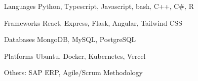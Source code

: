 

\begin{cvskills}

  \cvskill
  {Languages} %
  {} %
  {Python, Typescript, Javascript, bash, C++, C\#, R} %

  \cvskill
  {Frameworks} %
  {} %
  {React, Express, Flask, Angular, Tailwind CSS} %

  \cvskill
  {Databases} %
  {} %
  {MongoDB, MySQL, PostgreSQL} %

  \cvskill
  {Platforms} %
  {} %
  {Ubuntu, Docker, Kubernetes, Vercel} %


  \cvskill
  {Others:} %
  {} %
  {SAP ERP, Agile/Scrum Methodology} %



\end{cvskills}
